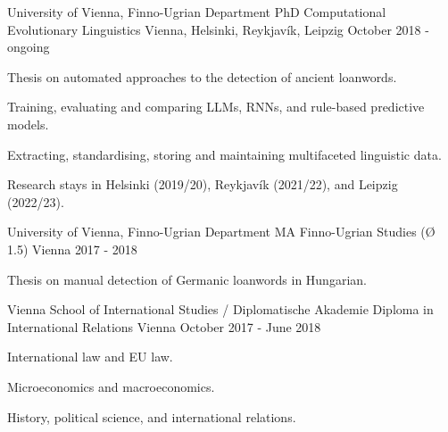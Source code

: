 

\begin{cventries}

  \cventry
    {University of Vienna, Finno-Ugrian Department} %
    {PhD Computational Evolutionary Linguistics} %
    {Vienna, Helsinki, Reykjavík, Leipzig} %
    {October 2018 - ongoing} %
    {
      \begin{cvitems} %
        \item{Thesis on automated approaches to the detection of ancient loanwords.}
        \item{Training, evaluating and comparing LLMs, RNNs, and rule-based predictive models.}
        \item{Extracting, standardising, storing and maintaining multifaceted linguistic data.}
        \item{Research stays in Helsinki (2019/20), Reykjavík (2021/22), and Leipzig (2022/23).}
      \end{cvitems}
    }

  \cventry
    {University of Vienna, Finno-Ugrian Department} %
    {MA Finno-Ugrian Studies (Ø 1.5)} %
    {Vienna} %
    {2017 - 2018} %
    {
      \begin{cvitems} %
        \item {Thesis on manual detection of Germanic loanwords in Hungarian.}
      \end{cvitems}
    }

  \cventry
    {Vienna School of International Studies / Diplomatische Akademie} %
    {Diploma in International Relations} %
    {Vienna} %
    {October 2017 - June 2018} %
    {
    \begin{cvitems} %
        \item{International law and EU law.}
        \item{Microeconomics and macroeconomics.}
        \item{History, political science, and international relations.}
      \end{cvitems}
    }
    

\end{cventries}
